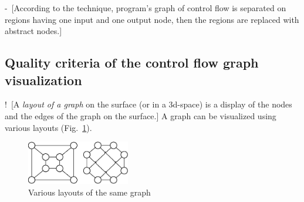 \documentclass[conference]{IEEEtran}
\newcommand{\rrr}[2][rcolor]{\noindent%
\textcolor{eclr}{-\ [}\textcolor{#1}{#2}\textcolor{eclr}{]}}
\newcommand{\nnn}[2][ncolor]{\noindent%
\textcolor{eclr}{!\ [}\textcolor{#1}{#2}\textcolor{eclr}{]}}
\begin{document}
\rrr{According to the technique, program's graph of control flow is separated  on regions having one input and one output node, then the regions are replaced with abstract nodes.}

\subsection{Quality criteria of the control flow graph visualization}

\nnn{A \emph{layout of a graph} on the surface (or in a 3d-space) is a display of the nodes and the edges of the graph on the surface.} A graph can be visualized using various layouts (Fig.~\ref{fig:VisExample}).

\begin{figure}[htbp]
	\centering
		\includegraphics[width=0.4\textwidth]{Pic/Pic1.eps}
	\caption{Various layouts of the same graph}
	\label{fig:VisExample}
\end{figure}
\end{document}
